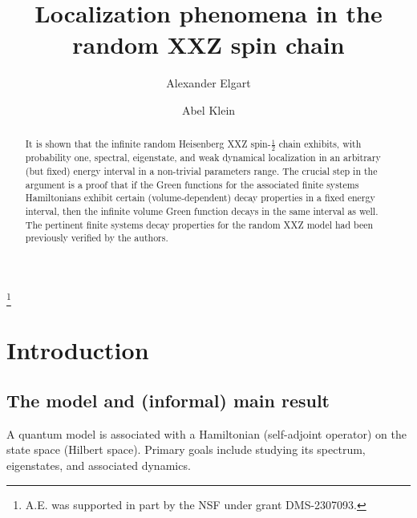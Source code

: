 \documentclass[12pt, a4paper,reqno]{amsart}
\numberwithin{equation}{section}
\begin{document}
\title[Localization in the  random XXZ  spin chain]{Localization phenomena in the  random XXZ  spin chain}
\author{Alexander Elgart}
\address[A. Elgart]{Department of Mathematics; Virginia Tech; Blacksburg, VA, 24061-1026, USA}

\author{Abel Klein}
\address[A. Klein]{University of California, Irvine;
Department of Mathematics;
Irvine, CA 92697-3875,  USA}



\thanks{A.E. was  supported in part by the NSF under grant DMS-2307093.}


\begin{abstract}


It is shown that the infinite random Heisenberg XXZ spin-$\frac12$ chain exhibits, with probability one, spectral, eigenstate, and weak dynamical localization in an arbitrary (but fixed)  energy interval in a non-trivial parameters range.
The crucial step  in the argument is  a proof that if the  Green functions for the associated finite  systems Hamiltonians exhibit certain (volume-dependent) decay properties in a fixed energy interval, then the infinite volume Green function  decays  in the same interval as well.  The pertinent finite systems  decay properties  for the random XXZ model had been previously verified by the authors.
 

 
\end{abstract}








\setcounter{tocdepth}{1}
\maketitle

\tableofcontents


\section{Introduction}\label{secmodel}

\subsection{The  model and    (informal) main result}  
A quantum model is associated with a Hamiltonian (self-adjoint operator) on the state space (Hilbert space). Primary goals include studying its spectrum,  eigenstates, and associated dynamics.
\end{document}
